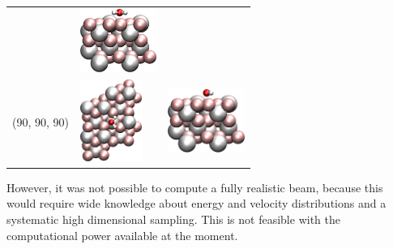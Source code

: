 \documentclass[11pt,DIV=13,BCOR=5mm,a4paper,headinclude]{scrbook}
\begin{document}
\begin{table}[!h]
\begin{tabular}{cp{4cm}p{4cm}}
& \includegraphics[width=2.5cm]{figures/0001/Ausrichtungsbilder/90_90_0-sidetest.png}\\
(90, 90, 90) & \includegraphics[width=2cm,angle=90]{figures/0001/Ausrichtungsbilder/90_90_90-toptest.png} 
& \includegraphics[width=2.5cm]{figures/0001/Ausrichtungsbilder/90_90_90-sidetest.png}\\\bottomrule
\end{tabular}
 \label{tab:orientations}
\end{table}
However, it was not possible to compute a fully realistic beam, because this would require wide knowledge about energy and velocity distributions and a systematic high dimensional sampling.
This is not feasible with the computational power available at the moment.
\end{document}
